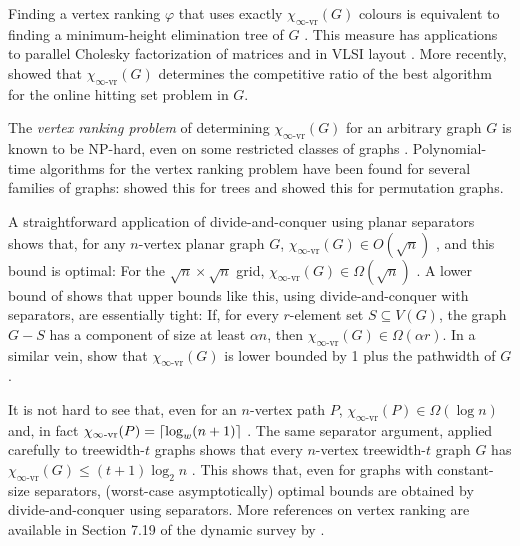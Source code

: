 \documentclass[kpfonts]{patmorin}
\newcommand{\rn}[1]{\chi_{\operatorname{#1-vr}}}
\newcommand{\irn}{\rn{\infty}}
\theoremstyle{named}
\begin{document}
Finding a vertex ranking $\varphi$ that uses exactly $\irn(G)$ colours is equivalent to finding a minimum-height elimination tree of $G$ \cite{torre.greenlaw.ea:optimal,deogun.kloks.ea:on}.  This measure has applications to parallel Cholesky factorization of matrices \cite{bodlaender.gilbert.ea:approximating,duff.reid:multifrontal,liu:role,dereniowski.kubale:cholesky} and in VLSI layout \cite{leiserson:area,sen.deng.ea:on}.  More recently, \citet{even.smorodinsky:hitting} showed that $\irn(G)$ determines the competitive ratio of the best algorithm for the online hitting set problem in $G$.

The \emph{vertex ranking problem} of determining $\irn(G)$ for an arbitrary graph $G$ is known to be NP-hard, even on some restricted classes of graphs \cite{bodlaender.deogun.ea:rankings,llewellyn.tovey.ea:local,llewellyn.tovey.ea:erratum,dereniowski.nadolski:vertex}. Polynomial-time algorithms for the vertex ranking problem have been found for several families of graphs: \citet{schaeffer:optimal,iyer.ratliff.ea:optimal} showed this for trees and \citet{deogun.kloks.ea:on} showed this for permutation graphs.

A straightforward application of divide-and-conquer using planar separators shows that, for any $n$-vertex planar graph $G$, $\irn(G) \in O(\sqrt{n})$ \cite{llewellyn.tovey.ea:local,katchalski.mccuaig.ea:ordered}, and this bound is optimal:  For the $\sqrt{n}\times\sqrt{n}$ grid, $\irn(G)\in \Omega(\sqrt{n})$ \cite{katchalski.mccuaig.ea:ordered}.  A lower bound of \citet{katchalski.mccuaig.ea:ordered} shows that upper bounds like this, using divide-and-conquer with separators, are essentially tight: If, for every $r$-element set $S\subseteq V(G)$, the graph $G-S$ has a component of size at least $\alpha n$, then $\irn(G) \in\Omega(\alpha r)$. In a similar vein, \citet{bodlaender.gilbert.ea:approximating,kloks:treewidth} show that $\irn(G)$ is lower bounded by 1 plus the pathwidth of $G$.

It is not hard to see that, even for an $n$-vertex path $P$, $\irn(P)\in\Omega(\log n)$ and, in fact $\irn(P)=\ceil{\log_w(n+1)}$ \cite{nesetril.ossona:tree-depth}.  The same separator argument, applied carefully to treewidth-$t$ graphs shows that every $n$-vertex treewidth-$t$ graph $G$ has $\irn(G)\le (t+1)\log_2 n$ \cite{nesetril.ossona:tree-depth}.  This shows that, even for graphs with constant-size separators, (worst-case asymptotically) optimal bounds are obtained by divide-and-conquer using separators.  More references on vertex ranking are available in Section 7.19 of the dynamic survey by \citet{gallian:dynamic}.
\end{document}
